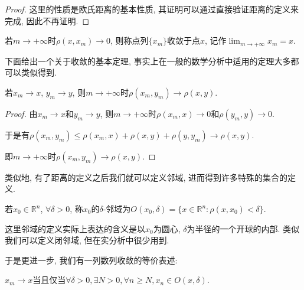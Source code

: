 \documentclass[theorem=false,mathfont=none,openany,sub3section]{easybook}
\begin{document}
\begin{proof}
  这里的性质是欧氏距离的基本性质, 其证明可以通过直接验证距离的定义来完成, 因此不再证明.\par
\end{proof}

\begin{definition}
  若$m \to +\infty$时$\rho(x,x_m)\to 0$, 则称点列$\{x_m\}$收敛于点$x$, 记作$\lim_{m \to +\infty}x_m= x$.\par
\end{definition}

下面给出一个关于收敛的基本定理, 事实上在一般的数学分析中适用的定理大多都可以类似得到.\par

\begin{theorem}
  若$x_m \to x$, $y_m \to y$, 则$m \to +\infty$时$\rho(x_m,y_m)\to \rho(x,y)$.\par
\end{theorem}

\begin{proof}
  由$x_m \to x$和$y_m \to y$, 则$m \to +\infty$时$\rho(x_m,x)\to 0$和$\rho(y_m,y)\to 0$.\par
  于是有$\rho(x_m,y_m)\leqslant \rho(x_m,x)+\rho(x,y)+\rho(y,y_m)\to \rho(x,y)$.\par
  即$m \to +\infty$时$\rho(x_m,y_m)\to \rho(x,y)$.\par
\end{proof}

类似地, 有了距离的定义之后我们就可以定义邻域, 进而得到许多特殊的集合的定义.\par

\begin{definition}
  若$x_0\in \mathbb{R}^n$, $\forall \delta>0$, 称$x_0$的$\delta$-邻域为$O(x_0, \delta)=\{x\in \mathbb{R}^n: \rho(x,x_0)<\delta\}$.\par
\end{definition}

\begin{remark}
  这里邻域的定义实际上表达的含义是以$x_0$为圆心, $\delta$为半径的一个开球的内部. 类似我们可以定义闭邻域, 但在实分析中很少用到.\par
\end{remark}

于是更进一步, 我们有一列数列收敛的等价表述:\par

\begin{theorem}
  $x_m \to x$当且仅当$\forall \delta >0, \exists N >0 , \forall n\geqslant N, x_n \in O(x,\delta)$.\par
\end{theorem}
\end{document}
